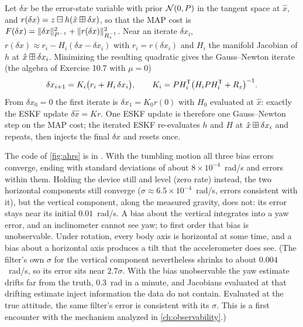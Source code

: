 \begin{solutions}
  \item Let $\delta x$ be the error-state variable with prior $\mathcal{N}(0, P)$ in the tangent space at $\hat x$, and $r(\delta x) = z\boxminus h(\hat x\boxplus\delta x)$, so that the MAP
        cost is $F(\delta x) = \|\delta x\|^2_{P^{-1}} + \|r(\delta x)\|^2_{R_z^{-1}}$. Near an iterate $\delta x_i$, $r(\delta x) \approx r_i - H_i(\delta x - \delta x_i)$ with $r_i = r(\delta x_i)$ and $H_i$ the
        manifold Jacobian of $h$ at $\hat x\boxplus\delta x_i$. Minimizing the resulting quadratic gives the Gauss--Newton iterate (the algebra of Exercise 10.7 with
        $\mu = 0$)
        \[
          \delta x_{i+1} = K_i\big(r_i + H_i\,\delta x_i\big), \qquad K_i = PH_i^{\mathsf{T}}\big(H_iPH_i^{\mathsf{T}} + R_z\big)^{-1} .
        \]
        From $\delta x_0 = 0$ the first iterate is $\delta x_1 = K_0r(0)$ with $H_0$ evaluated at $\hat x$: exactly the ESKF update $\delta\hat x = Kr$. One ESKF update is
        therefore one Gauss--Newton step on the MAP cost; the iterated ESKF re-evaluates $h$ and $H$ at $\hat x\boxplus\delta x_i$ and repeats, then injects the final
        $\delta x$ and resets once.

  \item The code of \cref{fig:ahrs} is  in . With the tumbling motion all three bias errors converge,
        ending with standard deviations of about $8\times10^{-4}$~rad/s and errors within them. Holding the device still and level (zero rate) instead, the
        two horizontal components still converge ($\sigma \approx 6.5\times10^{-4}$~rad/s, errors consistent with it), but the vertical component, along the measured
        gravity, does not: its error stays near its initial $0.01$~rad/s. A bias about the vertical integrates into a yaw error, and an inclinometer
        cannot see yaw; to first order that bias is unobservable. Under rotation, every body axis is horizontal at some time, and a bias about a
        horizontal axis produces a tilt that the accelerometer does see. (The filter's own $\sigma$ for the vertical component nevertheless shrinks to about
        $0.004$~rad/s, so its error sits near $2.7\sigma$. With the bias unobservable the yaw estimate drifts far from the truth, $0.3$~rad in a minute, and
        Jacobians evaluated at that drifting estimate inject information the data do not contain. Evaluated at the true attitude, the same filter's
        error is consistent with its $\sigma$. This is a first encounter with the mechanism analyzed in \cref{ch:observability}.)


\end{solutions}
